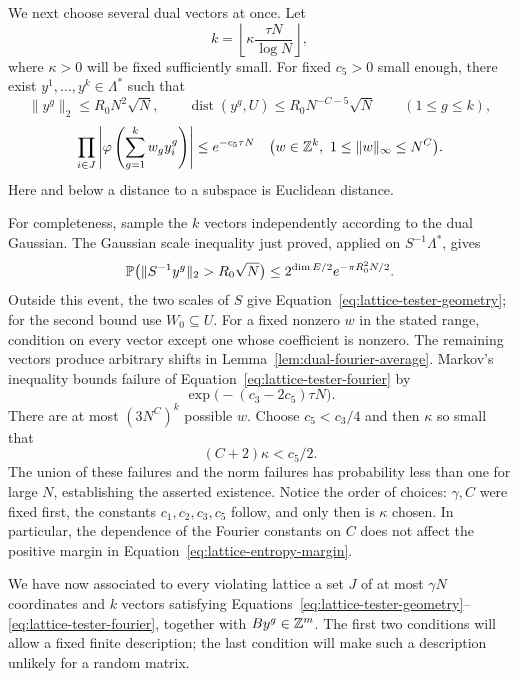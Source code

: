 We next choose several dual vectors at once.  Let
\begin{equation}\label{eq:lattice-number-testers}
 k=\left\lfloor\kappa\frac{\tau N}{\log N}\right\rfloor,
\end{equation}
where $\kappa>0$ will be fixed sufficiently small.
For fixed $c_5>0$ small enough, there exist
$y^1,\ldots,y^k\in\Lambda^*$ such that
\begin{equation}\label{eq:lattice-tester-geometry}
 \lVert y^g\rVert_2\le R_0N^2\sqrt N,
 \qquad\operatorname{dist}(y^g,U)\le R_0N^{-C-5}\sqrt N
 \qquad(1\le g\le k),
\end{equation}
\begin{equation}\label{eq:lattice-tester-fourier}
 \prod_{i\in J}\left|\varphi\left(\sum_{g=1}^k w_gy_i^g\right)\right|
 \le e^{-c_5\tau N}
 \quad\bigl(w\in\mathbb Z^k,\ 1\le\lVert w\rVert_\infty\le N^C\bigr).
\end{equation}
Here and below a distance to a subspace is Euclidean distance.

For completeness, sample the $k$ vectors independently according to
the dual Gaussian.  The Gaussian scale inequality just proved,
applied on $S^{-1}\Lambda^*$, gives
\[
 \mathbb P\bigl(\lVert S^{-1}y^g\rVert_2>R_0\sqrt N\bigr)
 \le 2^{\dim E/2}e^{-\pi R_0^2N/2}.
\]
Outside this event, the two scales of $S$ give
Equation~\eqref{eq:lattice-tester-geometry}; for the second bound use
$W_0\subseteq U$.  For a fixed nonzero $w$ in the stated range,
condition on every vector except one whose coefficient is nonzero.
The remaining vectors produce arbitrary shifts in
Lemma~\ref{lem:dual-fourier-average}.  Markov's inequality bounds
failure of Equation~\eqref{eq:lattice-tester-fourier} by
\[
 \exp\bigl(-(c_3-2c_5)\tau N\bigr).
\]
There are at most $(3N^C)^k$ possible $w$.
Choose $c_5<c_3/4$ and then $\kappa$ so small that
\begin{equation}\label{eq:lattice-kappa-choice}
 (C+2)\kappa<c_5/2.
\end{equation}
The union of these failures and the norm failures has probability
less than one for large $N$, establishing the asserted existence.
Notice the order of choices: $\gamma,C$ were fixed first, the
constants $c_1,c_2,c_3,c_5$ follow, and only then is $\kappa$ chosen.
In particular, the dependence of the Fourier constants on $C$ does
not affect the positive margin in
Equation~\eqref{eq:lattice-entropy-margin}.

We have now associated to every violating lattice a set $J$ of at
most $\gamma N$ coordinates and $k$ vectors satisfying
Equations~\eqref{eq:lattice-tester-geometry}--\eqref{eq:lattice-tester-fourier},
together with $By^g\in\mathbb Z^m$.  The first two conditions will allow a
fixed finite description; the last condition will make such a
description unlikely for a random matrix.

